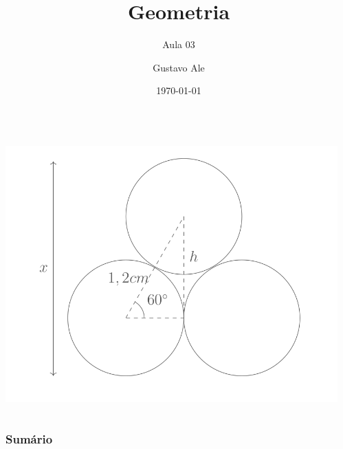 \documentclass[handout]{beamer}
\title{Geometria} %
\subtitle{Aula 03}
\author{Gustavo Ale} %
\institute[UFMT] %
{
EduCursinho - Faculdade de Engenharia \\ %
\medskip
\textit{gustavo.engca@gmail.com} %
}
\date{\today} %
\begin{document}
{
\begin{frame}
    \begin{columns}
        \begin{column}{0.48\textwidth}
            \includegraphics[width=\columnwidth,left]{../assets/geo.png}
        \end{column}
        \begin{column}{0.48\textwidth}
            \titlepage
        \end{column}
    \end{columns}

\end{frame}
}


\begin{frame}
    \frametitle{Sumário} %
    \tableofcontents %
\end{frame}
\end{document}
